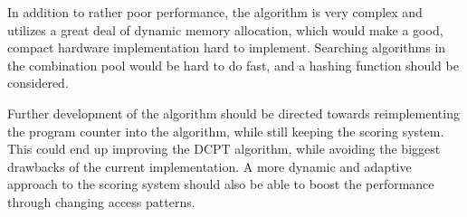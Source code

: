 In addition to rather poor performance, the algorithm is very complex and utilizes a great deal of dynamic memory allocation, which would make a good, compact hardware implementation hard to implement. Searching algorithms in the combination pool would be hard to do fast, and a hashing function should be considered.


Further development of the algorithm should be directed towards reimplementing the program counter into the algorithm, while still keeping the scoring system. This could end up improving the DCPT algorithm, while avoiding the biggest drawbacks of the current implementation. A more dynamic and adaptive approach to the scoring system should also be able to boost the performance through changing access patterns. 


%
%
%
